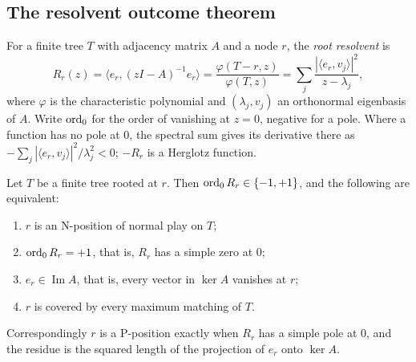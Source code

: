 \subsection{The resolvent outcome theorem}
For a finite tree $T$ with adjacency matrix $A$ and a node $r$, the \emph{root resolvent} is
\[
R_r(z)=\bigl\langle e_r,(zI-A)^{-1}e_r\bigr\rangle=\frac{\varphi(T-r,z)}{\varphi(T,z)}=\sum_j\frac{|\langle e_r,v_j\rangle|^2}{z-\lambda_j},
\]
where $\varphi$ is the characteristic polynomial and $(\lambda_j,v_j)$ an orthonormal eigenbasis of $A$. Write $\operatorname{ord}_0$ for the order of vanishing at $z=0$, negative for a pole. Where a function has no pole at $0$, the spectral sum gives its derivative there as $-\sum_j|\langle e_r,v_j\rangle|^2/\lambda_j^2<0$; $-R_r$ is a Herglotz function.

\begin{theorem}\label{thm:resolvent-outcome}
Let $T$ be a finite tree rooted at $r$. Then $\operatorname{ord}_0R_r\in\{-1,+1\}$, and the following are equivalent:
\begin{enumerate}[label=\textup{(\arabic*)}]
\item $r$ is an N-position of normal play on $T$;
\item $\operatorname{ord}_0R_r=+1$, that is, $R_r$ has a simple zero at $0$;
\item $e_r\in\operatorname{Im}A$, that is, every vector in $\ker A$ vanishes at $r$;
\item $r$ is covered by every maximum matching of $T$.
\end{enumerate}
Correspondingly $r$ is a P-position exactly when $R_r$ has a simple pole at $0$, and the residue is the squared length of the projection of $e_r$ onto $\ker A$.
\end{theorem}

